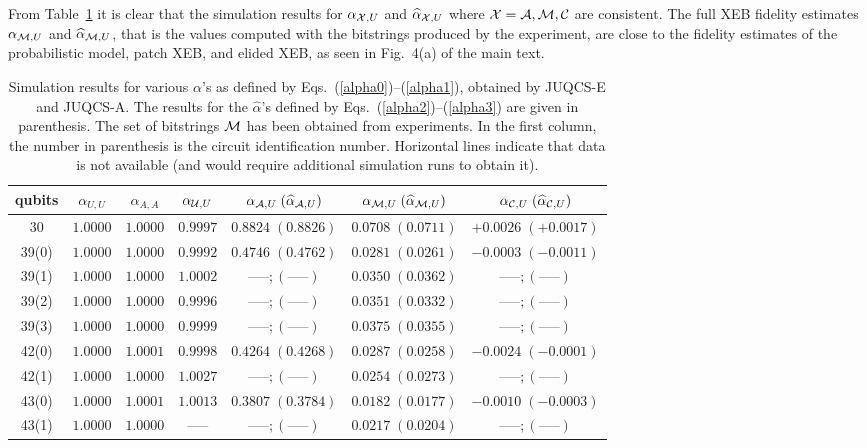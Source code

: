 From Table~\ref{tab1} it is clear that
the simulation results for  $\alpha_{{\cal X},U}$ and $\widehat\alpha_{{\cal X},U}$
where ${\cal X}={\cal A},{\cal M},{\cal C}$ are consistent.
The full XEB fidelity estimates $\alpha_{{\cal M},U}$ and $\widehat\alpha_{{\cal M},U}$, that is the values computed
with the bitstrings produced by the experiment, are close to the
fidelity estimates of the probabilistic model, patch XEB, and elided
XEB, as seen in Fig.~4(a) of the main text. 

\begin{table}[htbp]
\caption{
Simulation results for various $\alpha$'s as defined by Eqs.~(\ref{alpha0})--(\ref{alpha1}), obtained
by JUQCS-E and JUQCS-A.
The results for the $\widehat\alpha$'s defined by Eqs.~(\ref{alpha2})--(\ref{alpha3}) are given in parenthesis.
The set of bitstrings ${\cal M}$ has been obtained from experiments.
In the first column, the number in parenthesis is the circuit identification number.
Horizontal lines indicate that data is not available (and would require additional simulation runs to obtain it).
}
\begin{ruledtabular}
\begin{tabular}{ccccccc}
qubits &
$\alpha_{U,U}        $ &
$\alpha_{A,A}        $ &
$\alpha_{{\cal U},U} $ &
$\alpha_{{\cal A},U}\;(\widehat\alpha_{{\cal A},U}) $ &
$\alpha_{{\cal M},U}\;(\widehat\alpha_{{\cal M},U}) $ &
$\alpha_{{\cal C},U}\;(\widehat\alpha_{{\cal C},U}) $ \\
\hline\noalign{\smallskip}
30 & $1.0000$ &  $1.0000$ & $0.9997$ &   $0.8824\;(0.8826)$ &  $0.0708\;(0.0711)$ & $+0.0026\;(+0.0017)$ \\
39(0) & $1.0000$ &  $1.0000$ & $0.9992$ &   $0.4746\;(0.4762)$ &  $0.0281\;(0.0261)$ & $-0.0003\;(-0.0011)$ \\
39(1) & $1.0000$ &  $1.0000$ & $1.0002$ &   $\mbox{-----};(\mbox{-----})$ &  $0.0350\;(0.0362)$ & $\mbox{-----};(\mbox{-----})$ \\
39(2) & $1.0000$ &  $1.0000$ & $0.9996$ &   $\mbox{-----};(\mbox{-----})$ &  $0.0351\;(0.0332)$ & $\mbox{-----};(\mbox{-----})$ \\
39(3) & $1.0000$ &  $1.0000$ & $0.9999$ &   $\mbox{-----};(\mbox{-----})$ &  $0.0375\;(0.0355)$ & $\mbox{-----};(\mbox{-----})$ \\
42(0) & $1.0000$ &  $1.0001$ & $0.9998$ &   $0.4264\;(0.4268)$ &  $0.0287\;(0.0258)$ & $-0.0024\;(-0.0001)$ \\
42(1) & $1.0000$ &  $1.0000$ & $1.0027$ &   $\mbox{-----};(\mbox{-----})$ &  $0.0254\;(0.0273)$ & $\mbox{-----};(\mbox{-----})$ \\
43(0) & $1.0000$ &  $1.0001$ & $1.0013$ &   $0.3807\;(0.3784)$ &  $0.0182\;(0.0177)$ & $-0.0010\;(-0.0003)$ \\
43(1) & $1.0000$ &  $1.0000$ & $\mbox{-----}$ &   $\mbox{-----};(\mbox{-----})$ &  $0.0217\;(0.0204)$ & $\mbox{-----};(\mbox{-----})$ \\
\end{tabular}
\end{ruledtabular}
\label{tab1}
\end{table}

